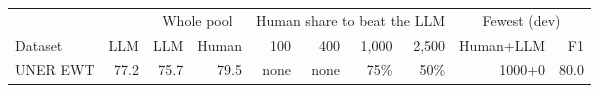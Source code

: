 \begin{tabular}{lrrrrrrrrr}
\toprule
 & & \multicolumn{2}{c}{Whole pool} & \multicolumn{4}{c}{Human share to beat the LLM} & \multicolumn{2}{c}{Fewest (dev)} \\
Dataset & LLM & LLM & Human & 100 & 400 & 1{,}000 & 2{,}500 & Human+LLM & F1 \\
\midrule
UNER EWT & 77.2 & 75.7 & 79.5 & none & none & 75\% & 50\% & 1000+0 & 80.0 \\
\bottomrule
\end{tabular}
